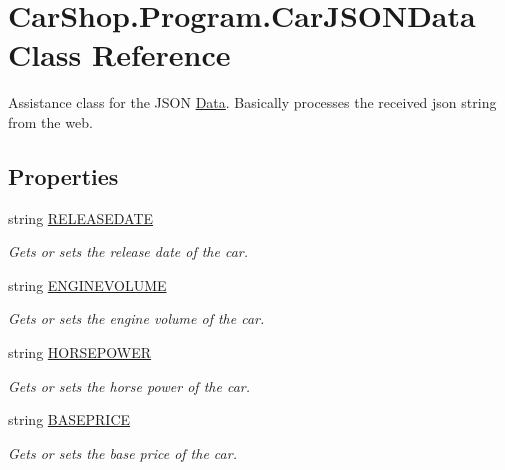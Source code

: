 \hypertarget{class_car_shop_1_1_program_1_1_car_j_s_o_n_data}{}\section{Car\+Shop.\+Program.\+Car\+J\+S\+O\+N\+Data Class Reference}
\label{class_car_shop_1_1_program_1_1_car_j_s_o_n_data}


Assistance class for the J\+S\+ON \mbox{\hyperlink{namespace_car_shop_1_1_data}{Data}}. Basically processes the received json string from the web.  


\subsection*{Properties}
\begin{DoxyCompactItemize}
\item 
string \mbox{\hyperlink{class_car_shop_1_1_program_1_1_car_j_s_o_n_data_a08e32a3f9242d2582bd53f479cb18198}{R\+E\+L\+E\+A\+S\+E\+D\+A\+TE}}
\begin{DoxyCompactList}\small\item\em Gets or sets the release date of the car. \end{DoxyCompactList}\item 
string \mbox{\hyperlink{class_car_shop_1_1_program_1_1_car_j_s_o_n_data_a8a50b087b0b820e461f39fc58d033dc6}{E\+N\+G\+I\+N\+E\+V\+O\+L\+U\+ME}}
\begin{DoxyCompactList}\small\item\em Gets or sets the engine volume of the car. \end{DoxyCompactList}\item 
string \mbox{\hyperlink{class_car_shop_1_1_program_1_1_car_j_s_o_n_data_a2f5fb18c88a3fabc827dc7b89eb84cfe}{H\+O\+R\+S\+E\+P\+O\+W\+ER}}
\begin{DoxyCompactList}\small\item\em Gets or sets the horse power of the car. \end{DoxyCompactList}\item 
string \mbox{\hyperlink{class_car_shop_1_1_program_1_1_car_j_s_o_n_data_a6c82d31de8c426d48b8851760ce5534d}{B\+A\+S\+E\+P\+R\+I\+CE}}
\begin{DoxyCompactList}\small\item\em Gets or sets the base price of the car. \end{DoxyCompactList}\end{DoxyCompactItemize}


